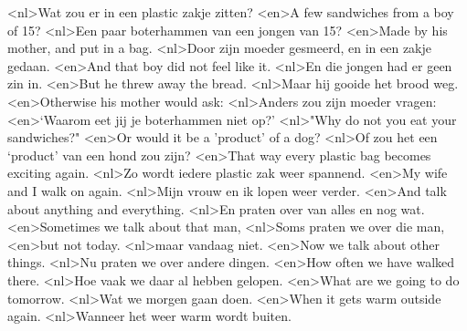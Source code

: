 <nl>Wat zou er in een plastic zakje zitten?
<en>A few sandwiches from a boy of 15?
<nl>Een paar boterhammen van een jongen van 15?
<en>Made by his mother, and put in a bag.
<nl>Door zijn moeder gesmeerd, en in een zakje gedaan.
<en>And that boy did not feel like it.
<nl>En die jongen had er geen zin in.
<en>But he threw away the bread.
<nl>Maar hij gooide het brood weg.
<en>Otherwise his mother would ask:
<nl>Anders zou zijn moeder vragen:
<en>`Waarom eet jij je boterhammen niet op?'
<nl>"Why do not you eat your sandwiches?"
<en>Or  would it  be a 'product' of a dog?
<nl>Of zou het een `product' van een hond zou zijn?
<en>That way every plastic bag becomes exciting again.
<nl>Zo wordt iedere plastic zak weer spannend.
<en>My wife and I walk on again.
<nl>Mijn vrouw en ik lopen weer verder.
<en>And talk about anything and everything.
<nl>En praten over van alles en nog wat.
<en>Sometimes we talk about that man,
<nl>Soms praten we over die man,
<en>but not today.
<nl>maar vandaag niet.
<en>Now we talk about other things.
<nl>Nu praten we over andere dingen.
<en>How often we have walked there.
<nl>Hoe vaak we daar al hebben gelopen.
<en>What are we going to do tomorrow.
<nl>Wat we morgen gaan doen.
<en>When it  gets warm outside again.
<nl>Wanneer het weer warm wordt buiten.
